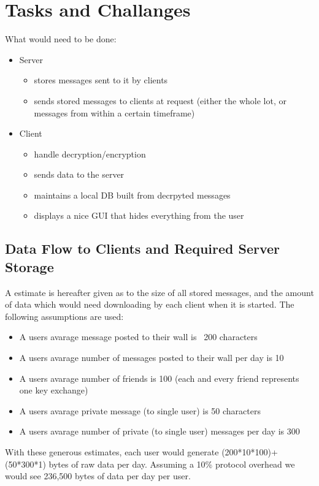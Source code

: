 \section{Tasks and Challanges}
What would need to be done:
\begin{itemize}
\item  Server
    \begin{itemize}
    \item stores messages sent to it by clients
    \item sends stored messages to clients at request (either the whole lot, or
    messages from within a certain timeframe)
    \end{itemize}
\item Client
    \begin{itemize}
    \item handle decryption/encryption
    \item sends data to the server
    \item maintains a local DB built from decrpyted messages
    \item displays a nice GUI that hides everything from the user
    \end{itemize}
\end{itemize}

\subsection{Data Flow to Clients and Required Server Storage}
A estimate is hereafter given as to the size of all stored messages, and the
amount of data which would need downloading by each client when it is started.
The following assumptions are used:
\begin{itemize}
\item A users avarage message posted to their wall is ~200 characters
\item A users avarage number of messages posted to their wall per day is 10
\item A users avarage number of friends is 100 (each and every friend represents
one key exchange)
\item A users avarage private message (to single user) is 50 characters
\item A users avarage number of private (to single user) messages per day is 300
\end{itemize}
With these generous estimates, each user would generate (200*10*100)+(50*300*1)
bytes of raw data per day. Assuming a 10\% protocol overhead we would see
236,500 bytes of data per day per user.\\

